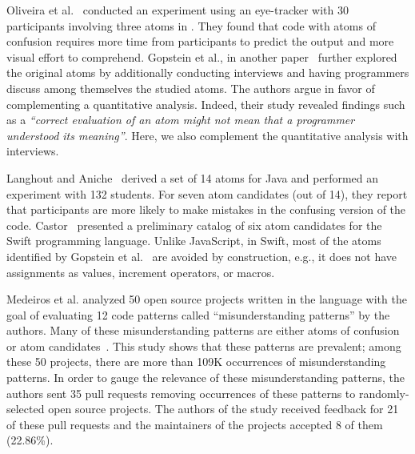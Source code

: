 
Oliveira et al.~\cite{TheEyesDoNotLie} conducted an experiment using an eye-tracker with 30 participants involving three atoms in \clang. They found that code with atoms of confusion requires more time from participants to predict the output and more visual effort to comprehend. Gopstein et al., in another paper~\cite{ThinkingAloud} further explored the original atoms by additionally conducting interviews and having programmers discuss among themselves the studied atoms. The authors argue in favor of complementing a quantitative analysis. Indeed, their study revealed findings such as a \textit{``correct evaluation of an atom might not mean that a programmer understood its meaning''}. Here, we also complement the quantitative analysis with interviews.

Langhout and Aniche~\cite{Langhout:2021:ACJ} derived a set of 14 atoms for Java and performed an experiment with 132 students. For seven atom candidates (out of 14), they report that participants are more likely to make mistakes in the confusing version of the code. Castor~\cite{castor2018} presented a preliminary catalog of six atom candidates for the Swift programming language. Unlike JavaScript, in Swift, most of the atoms identified by Gopstein et al.~\cite{DBLP:conf/sigsoft/GopsteinIYDZYC17} are avoided by construction, e.g., it does not have assignments as values, increment operators, or macros. 

Medeiros et al. \cite{DBLP:journals/ese/MedeirosLAAKRG19} analyzed 50 open source projects written in the \clang language with the goal of evaluating 12 code patterns called ``misunderstanding patterns'' by the authors. Many of these misunderstanding patterns are either atoms of confusion or atom candidates~\cite{DBLP:conf/sigsoft/GopsteinIYDZYC17}. This study shows that these patterns are prevalent; among these 50 projects, there are more than 109K occurrences of misunderstanding patterns. 
In order to gauge the relevance of these misunderstanding patterns, the authors sent 35 pull requests removing occurrences of these patterns to randomly-selected open source projects. The authors of the study received feedback for 21 of these pull requests and the maintainers of the projects accepted 8 of them (22.86\%). 

